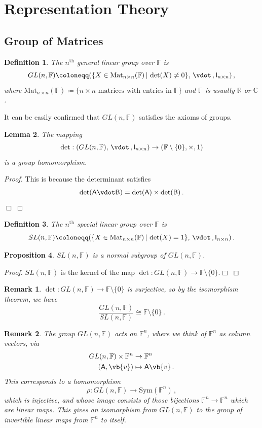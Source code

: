 \documentclass{article}
\theoremstyle{plain}\theoremheaderfont{\normalfont\itshape}\theorembodyfont{\rmfamily}\theoremseparator{.}\newtheorem*{rem}{Remark}\newtheorem*{ex}{Example}\newtheorem*{proof}{Proof}\newtheorem*{altp}{Alternative proof}
\theoremstyle{plain}\theoremheaderfont{\normalfont\bfseries}\theorembodyfont{\rmfamily}\theoremseparator{.}\newtheorem{thm}{Theorem}[section]\newtheorem{lem}[thm]{Lemma}\newtheorem{prop}[thm]{Proposition}\newtheorem*{cor}{Corollary}\newtheorem{defn}[thm]{Definition}\newtheorem{clm}[thm]{Claim}\newtheorem{clminproof}{Claim}
\theoremstyle{break}\theoremheaderfont{\normalfont\itshape}\theorembodyfont{\rmfamily}\theoremseparator{.\medskip}\newtheorem*{proofskip}{Proof}\newtheorem*{exs}{Examples}\newtheorem*{rems}{Remarks}
\theoremstyle{break}\theoremheaderfont{\normalfont\bfseries}\theorembodyfont{\rmfamily}\theoremseparator{.\medskip}\newtheorem{lemskip}[thm]{Lemma}\newtheorem{defnskip}[thm]{Definition}\newtheorem{propskip}[thm]{Proposition}\newtheorem{thmskip}[thm]{Theorem}
\numberwithin{equation}{section}
\newcommand{\qed}{\hfill\ensuremath{\Box}}
\begin{document}
	\newpage

	\section{Representation Theory}
	\subsection{Group of Matrices}
	\begin{defn}
		The \textit{\(n^\text{th}\) general linear group} over \(\mathbb{F}\) is
		\[GL(n,\mathbb{F})\coloneqq(\{X\in\mathrm{Mat}_{n\times n}(\mathbb{F})\,|\,\det(X)\ne 0\},\,\vdot\,,\mathsf{I}_{n\times n})\,,\]
		where \(\mathrm{Mat}_{n\times n}(\mathbb{F})\coloneqq\{n\times n \text{ matrices with entries in }\mathbb{F}\}\) and \(\mathbb{F}\) is usually \(\mathbb{R}\) or \(\mathbb{C}\).
	\end{defn}
	It can be easily confirmed that \(GL(n,\mathbb{F})\) satisfies the axioms of groups.
	\begin{lem}
		The mapping
		\[\det : (GL(n,\mathbb{F}), \,\vdot\,, \mathsf{I}_{n\times n}) \to (\mathbb{F} \setminus \{0\}, \times , 1)\]
		is a group homomorphism.
	\end{lem}
	\begin{proof}
		This is because the determinant satisfies
		\[\det(\mathsf{A}\vdot\mathsf{B})=\det(\mathsf{A})\times\det(\mathsf{B})\,.\]\qed
	\end{proof}
	\begin{defn}
		The \textit{\(n^\text{th}\) special linear group} over \(\mathbb{F}\) is
		\[SL(n,\mathbb{F})\coloneqq(\{X\in\mathrm{Mat}_{n\times n}(\mathbb{F})\,|\,\det(X)=1\},\,\vdot\,,\mathsf{I}_{n\times n})\,.\]
	\end{defn}
	\begin{prop}
		\(SL(n,\mathbb{F})\) is a normal subgroup of \(GL(n,\mathbb{F})\).
	\end{prop}
	\begin{proof}
		\(SL(n,\mathbb{F})\) is the kernel of the map \(\det : GL(n,\mathbb{F})\to \mathbb{F}\setminus\{0\}\).\qed
	\end{proof}
	\begin{rem}
		\(\det : GL(n,\mathbb{F})\to \mathbb{F}\setminus\{0\}\) is surjective, so by the isomorphism theorem, we have
		\[\frac{GL(n,\mathbb{F})}{SL(n,\mathbb{F})}\cong\mathbb{F}\setminus\{0\}\,.\]
	\end{rem}
	\begin{rem}
		The group \(GL(n,\mathbb{F})\) acts on \(\mathbb{F}^n\), where we think of \(\mathbb{F}^n\) as column vectors, via
		\begin{align*}
			GL(n,\mathbb{F}) \times \mathbb{F}^n &\to \mathbb{F}^n\\
			(\mathsf{A}, \vb{v}) &\mapsto\mathsf{A}\vb{v}\,.
		\end{align*}
		This corresponds to a homomorphism
		\[\rho : GL(n,\mathbb{F}) \to \mathrm{Sym}(\mathbb{F}^n)\,,\]
		which is injective, and whose image consists of those bijections \(\mathbb{F}^n\to\mathbb{F}^n\) which are linear maps. This gives an isomorphism from \(GL(n,\mathbb{F})\) to the group of invertible linear maps
		from \(\mathbb{F}^n\)	to itself.
	\end{rem}
\end{document}
